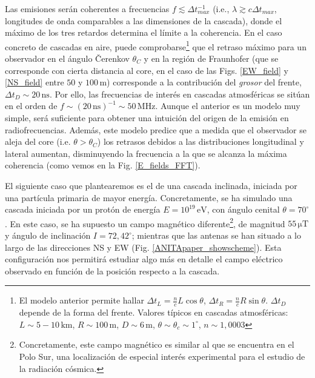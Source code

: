 \documentclass[11 pt, a4paper]{article} %
\numberwithin{equation}{section}
\numberwithin{figure}{section}
\numberwithin{table}{section}
\begin{document}
Las emisiones serán coherentes a frecuencias $f\lesssim\Delta t_{max}^{-1}$ (i.e., $\lambda\gtrsim c\Delta t_{max}$, longitudes de onda comparables a las dimensiones de la cascada), donde el máximo de los tres retardos determina el límite a la coherencia. En el caso concreto de cascadas en aire, puede comprobarse\footnote{El modelo anterior permite hallar $\Delta t_{L}=\frac{n}{c}L\cos{\theta}$, $\Delta t_{R}=\frac{n}{c}R\sin{\theta}$. $\Delta t_D$ depende de la forma del frente. Valores típicos en cascadas atmosféricas: $L\sim 5-10\,\mathrm{km}$, $R\sim100\,\mathrm{m}$, $D\sim6\,\mathrm{m}$, $\theta\sim\theta_c\sim1^\circ$, $n\sim1,0003$} que el retraso máximo para un observador en el ángulo \v{C}erenkov $\theta_C$ y en la región de Fraunhofer (que se corresponde con cierta distancia al core, en el caso de las Figs. \ref{EW_field} y \ref{NS_field} entre $50$ y $100\,\mathrm{m}$) corresponde a la contribución del \textit{grosor} del frente, $\Delta t_D\sim 20\,\mathrm{ns}$. Por ello, las frecuencias de interés en cascadas atmosféricas se sitúan en el orden de $f\sim\left(20\,\mathrm{ns}\right)^{-1}\sim50\,\mathrm{MHz}$. Aunque el anterior es un modelo muy simple, será suficiente para obtener una intuición del origen de la emisión en radiofrecuencias. Además, este modelo predice que a medida que el observador se aleja del core (i.e. $\theta>\theta_C$) los retrasos debidos a las distribuciones longitudinal y lateral aumentan, disminuyendo la frecuencia a la que se alcanza la máxima coherencia (como vemos en la Fig. \ref{E_fields_FFT}).

El siguiente caso que plantearemos es el de una cascada inclinada, iniciada por una partícula primaria de mayor energía. Concretamente, se ha simulado una cascada iniciada por un protón de energía $E=10^{19}\,\mathrm{eV}$, con ángulo cenital $\theta=70^{\circ}$. En este caso, se ha supuesto un campo magnético diferente\footnote{ Concretamente, este campo magnético es similar al que se encuentra en el Polo Sur, una localización de especial interés experimental para el estudio de la radiación cósmica.}, de magnitud $55\,\mathrm{\mu T}$ y ángulo de inclinación $I = 72,42^\circ$; mientras que las antenas se han situado a lo largo de las direcciones NS y EW (Fig. \ref{ANITApaper_showscheme}). Esta configuración nos permitirá estudiar algo más en detalle el campo eléctrico observado en función de la posición respecto a la cascada.
\end{document}
